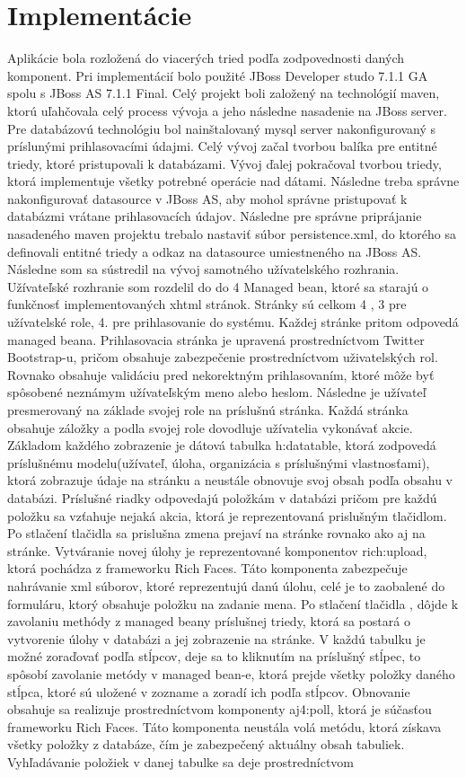 \section{Implementácie}
Aplikácie bola rozložená do viacerých tried podľa zodpovednosti daných komponent. Pri implementácií bolo použité JBoss Developer studo 7.1.1 GA spolu s JBoss AS 7.1.1 Final. Celý projekt boli založený na technológií maven, ktorú uľahčovala celý process vývoja a jeho následne nasadenie na JBoss server. Pre databázovú technológiu bol nainštalovaný mysql server nakonfigurovaný s príslunými prihlasovacími údajmi. Celý vývoj začal tvorbou balíka pre entitné triedy, ktoré pristupovali k databázami. Vývoj ďalej pokračoval tvorbou triedy, ktorá implementuje všetky potrebné operácie nad dátami. Následne treba správne nakonfigurovať datasource v JBoss AS, aby mohol správne pristupovať k databázmi vrátane prihlasovacích údajov. Následne pre správne priprájanie nasadeného maven projektu trebalo nastaviť súbor persistence.xml, do ktorého sa definovali entitné triedy a odkaz na datasource umiestneného na JBoss AS. Následne som sa sústredil na vývoj samotného užívatelského rozhrania. Užívateľské rozhranie som rozdelil do do 4 Managed bean, ktoré sa starajú o funkčnosť implementovaných xhtml stránok. Stránky sú celkom 4 , 3 pre užívatelské role, 4. pre prihlasovanie do systému. Každej stránke pritom odpovedá managed beana. Prihlasovacia stránka je upravená prostredníctvom Twitter Bootstrap-u, pričom obsahuje zabezpečenie prostredníctvom uživatelských rol. Rovnako obsahuje validáciu pred nekorektným prihlasovaním, ktoré môže byť spôsobené neznámym užívateľským meno alebo heslom. Následne je užívateľ presmerovaný na základe svojej role na príslušnú stránka. Každá stránka obsahuje záložky a podla svojej role dovodluje užívatelia vykonávať akcie. Základom každého zobrazenie je dátová tabulka h:datatable, ktorá zodpovedá príslušnému modelu(užívateľ, úloha, organizácia s príslušnými vlastnosťami), ktorá zobrazuje údaje na stránku a neustále obnovuje svoj obsah podľa obsahu v databázi. Príslušné riadky odpovedajú položkám v databázi pričom pre každú položku sa vzťahuje nejaká akcia, ktorá je reprezentovaná prislušným tlačidlom. Po stlačení tlačidla sa prislušna zmena prejaví na stránke rovnako ako aj na stránke. Vytváranie novej úlohy je reprezentované komponentov rich:upload, ktorá pochádza z frameworku Rich Faces. Táto komponenta zabezpečuje nahrávanie xml súborov, ktoré reprezentujú danú úlohu, celé je to zaobalené do formuláru, ktorý obsahuje položku na zadanie mena. Po stlačení tlačidla , dôjde k zavolaniu methódy z managed beany príslušnej triedy, ktorá sa postará o vytvorenie úlohy v databázi a jej zobrazenie na stránke. V každú tabulku je možné zoraďovať podľa stĺpcov, deje sa to kliknutím na príslušný stĺpec, to spôsobí zavolanie metódy v managed bean-e, ktorá prejde všetky položky daného stĺpca, ktoré sú uložené v zozname a zoradí ich podľa stĺpcov. Obnovanie obsahuje sa realizuje prostredníctvom komponenty aj4:poll, ktorá je súčasťou frameworku Rich Faces. Táto komponenta neustála volá metódu, ktorá získava všetky položky z databáze, čím je zabezpečený aktuálny obsah tabuliek. Vyhľadávanie položiek v danej tabulke sa deje prostredníctvom 